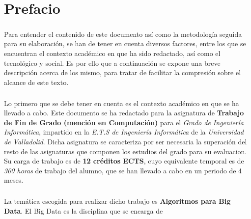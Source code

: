\documentclass{subfiles}
\begin{document}
  \chapter*{Prefacio}

    \paragraph{}
    Para entender el contenido de este documento así como la metodología seguida para su elaboración, se han de tener en cuenta diversos factores, entre los que se encuentran el contexto académico en que ha sido redactado, así como el tecnológico y social. Es por ello que a continuación se expone una breve descripción acerca de los mismo, para tratar de facilitar la compresión sobre el alcance de este texto.

    \paragraph{}
    Lo primero que se debe tener en cuenta es el contexto académico en que se ha llevado a cabo. Este documento se ha redactado para la asignatura de \textbf{Trabajo de Fin de Grado (mención en Computación)} para el \emph{Grado de Ingeniería Informática}, impartido en la \emph{E.T.S de Ingeniería Informática} de la \emph{Universidad de Valladolid}. Dicha asignatura se caracteriza por ser necesaria la superación del resto de las asignaturas que componen los estudios del grado para su evaluacion. Su carga de trabajo es de \textbf{12 créditos ECTS}, cuyo equivalente temporal es de \emph{300 horas} de trabajo del alumno, que se han llevado a cabo en un periodo de 4 meses.

    \paragraph{}
    La temática escogida para realizar dicho trabajo es \textbf{Algoritmos para Big Data}. El Big Data es la disciplina que se encarga de \cite{wiki:big_data}
\end{document}
